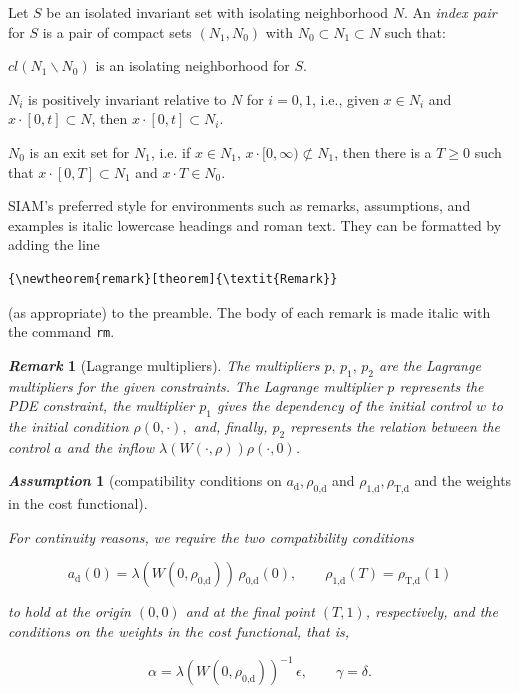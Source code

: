 \documentclass[final,leqno,onetabnum]{siamltex0315}
\newtheorem{assumption}[theorem]{\textit{Assumption}}
\newtheorem{remark}[theorem]{\textit{Remark}}
\newcommand{\lW}[1]{\ensuremath{\lambda(W({#1},\rho))}}
\newcommand{\rhol}{\ensuremath{\rho_{\text{1,d}}}}
\newcommand{\rhoo}{\ensuremath{\rho_{\text{0,d}}}}
\newcommand{\ad}{\ensuremath{a_{\text{d}}}}
\newcommand{\rhoT}{\ensuremath{\rho_{\text{T,d}}}}
\begin{document}
\begin{definition}
{\rm Let $S$ be an isolated invariant set with isolating neighborhood $N$.
An {\em index pair} for $S$ is a pair of compact sets $(N_{1},N_{0})$
with $N_{0} \subset N_{1} \subset N$ such that:
\begin{romannum}
\item $cl(N_{1} \backslash N_{0})$
is an isolating neighborhood for $S$.
\item $N_{i}$ is positively invariant relative to $N$ for $i=0,1$,
i.e., given
$x \in N_{i}$ and $x \cdot [0,t] \subset N$, then $x \cdot [0,t] \subset
N_{i}$.
\item $N_{0}$ is an exit set for $N_{1}$, i.e. if $x \in N_{1}$,
$x \cdot [0, \infty ) \not\subset N_{1}$, then there is a $T \geq 0$ such
that $x \cdot [0,T] \subset N_{1}$ and $x \cdot T \in N_{0}$.
\end{romannum}}
\end{definition}

SIAM's preferred style for environments such as remarks, assumptions, and examples is italic lowercase headings and roman text.  They can be formatted by adding the line 
\begin{verbatim}{\newtheorem{remark}[theorem]{\textit{Remark}}\end{verbatim} (as appropriate) to the preamble.  The body of each remark is made italic with the command \texttt{rm}.

\begin{remark}[Lagrange multipliers]{\rm
The multipliers $p,\,p_{1},\,p_{2}$ are the Lagrange multipliers for the given constraints. The Lagrange multiplier $p$ represents the PDE constraint, the multiplier $p_{1}$ gives the dependency
 of the initial control $w$ to the initial condition $\rho(0,\cdot),$ and, finally, $p_{2}$ represents the relation between the control $a$ and the inflow $\lW{\cdot}\rho(\cdot,0)$.}\end{remark}

\begin{assumption}[compatibility conditions on  $\ad,\rhoo$ and $\rhol,\rhoT$ and the weights in the cost functional]\label{ass:compatibility}{\rm
For continuity reasons, we require the two compatibility conditions
\begin{linenomath*}
\[
 \ad(0)=\lambda(W(0,\rhoo))\,\rhoo(0),\qquad \rhol(T)=\rhoT(1)
\]
\end{linenomath*}
to hold at the origin $(0,0)$ and at the final point $(T,1)$, respectively, and the conditions on the weights in the cost functional, that is,
\begin{linenomath*}
\[
 \alpha=\lambda(W(0,\rhoo))^{-1}\,\epsilon,\qquad\gamma=\delta.
\]
\end{linenomath*}
}\end{assumption}
\end{document}
